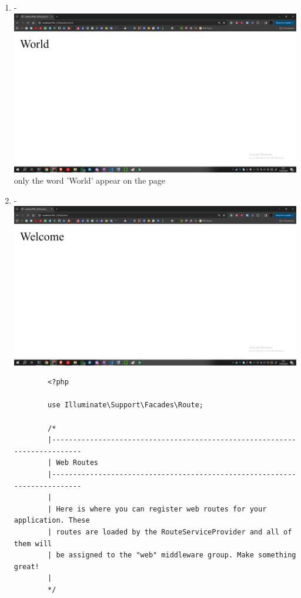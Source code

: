 \documentclass[12pt,titlepage]{article}
\begin{document}
\begin{enumerate}[label=\alph*.]
\begin{verbatim}
        Route::get('/', function () {
            return view('welcome');
        });
        
        Route::get('/hello', function () {
            return 'Hello World';
        });
        
        Route::get('/world', function () {
            return 'World';
        }); 
    \end{verbatim}
    \newpage
    \item -\\ \includegraphics[width=.9\textwidth]{images/figures/basic routing e.png} \\ only the word 'World' appear on the page
    \item - \\ \includegraphics[width=.9\textwidth]{images/figures/basic routing f.png}
    \begin{verbatim}
        <?php

        use Illuminate\Support\Facades\Route;
        
        /*
        |--------------------------------------------------------------------------
        | Web Routes
        |--------------------------------------------------------------------------
        |
        | Here is where you can register web routes for your application. These
        | routes are loaded by the RouteServiceProvider and all of them will
        | be assigned to the "web" middleware group. Make something great!
        |
        */
        

\end{verbatim}
\end{enumerate}
\end{document}
